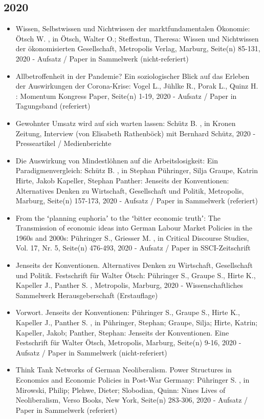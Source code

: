  \subsection{2020} 
 \begin{itemize} 
	 \item Wissen, Selbstwissen und Nichtwissen der marktfundamentalen Ökonomie: Ötsch W. , in Ötsch, Walter O.; Steffestun, Theresa: Wissen und Nichtwissen der ökonomisierten Gesellschaft, Metropolis Verlag, Marburg, Seite(n) 85-131, 2020 - Aufsatz / Paper in Sammelwerk (nicht-referiert)
	 \item Allbetroffenheit in der Pandemie? Ein soziologischer Blick auf das Erleben der Auswirkungen der Corona-Krise: Vogel L., Jühlke R., Porak L., Quinz H. : Momentum Kongress Paper, Seite(n) 1-19, 2020 - Aufsatz / Paper in Tagungsband (referiert)
	 \item Gewohnter Umsatz wird auf sich warten lassen: Schütz B. , in Kronen Zeitung, Interview (von Elisabeth Rathenböck) mit Bernhard Schütz, 2020 - Presseartikel / Medienberichte
	 \item Die Auswirkung von Mindestlöhnen auf die Arbeitslosigkeit: Ein Paradigmenvergleich: Schütz B. , in Stephan Pühringer, Silja Graupe, Katrin Hirte, Jakob Kapeller, Stephan Panther: Jenseits der Konventionen: Alternatives Denken zu Wirtschaft, Gesellschaft und Politik, Metropolis, Marburg, Seite(n) 157-173, 2020 - Aufsatz / Paper in Sammelwerk (referiert)
	 \item From the ʻplanning euphoriaʼ to the ʻbitter economic truthʼ: The Transmission of economic ideas into German Labour Market Policies in the 1960s and 2000s: Pühringer S., Griesser M. , in Critical Discourse Studies, Vol. 17, Nr. 5, Seite(n) 476-493, 2020 - Aufsatz / Paper in SSCI-Zeitschrift
	 \item Jenseits der Konventionen. Alternatives Denken zu Wirtschaft, Gesellschaft und Politik. Festschrift für Walter Ötsch: Pühringer S., Graupe S., Hirte K., Kapeller J., Panther S. , Metropolis, Marburg, 2020 - Wissenschaftliches Sammelwerk Herausgeberschaft (Erstauflage)
	 \item Vorwort. Jenseits der Konventionen: Pühringer S., Graupe S., Hirte K., Kapeller J., Panther S. , in Pühringer, Stephan; Graupe, Silja; Hirte, Katrin; Kapeller, Jakob; Panther, Stephan: Jenseits der Konventionen. Eine Festschrift für Walter Ötsch, Metropolis, Marburg, Seite(n) 9-16, 2020 - Aufsatz / Paper in Sammelwerk (nicht-referiert)
	 \item Think Tank Networks of German Neoliberalism. Power Structures in Economics and Economic Policies in Post-War Germany: Pühringer S. , in Mirowski, Philip; Plehwe, Dieter; Slobodian, Quinn: Nines Lives of Neoliberalism, Verso Books, New York, Seite(n) 283-306, 2020 - Aufsatz / Paper in Sammelwerk (referiert)

\end{itemize}

